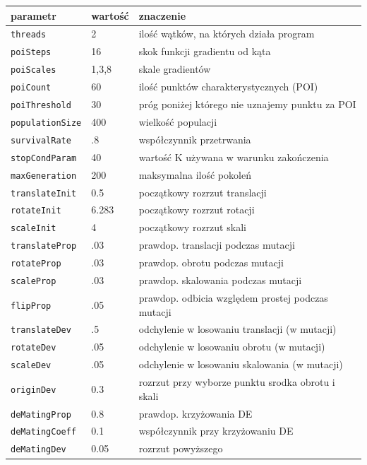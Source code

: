 \documentclass[a4paper,12pt,leqno]{article}
\begin{document}
\begin{tabular}{l|l|l}
parametr                & wartość & znaczenie \\
\hline
\texttt{threads}        & 2     & ilość wątków, na których działa program \\
\hline
\texttt{poiSteps}       & 16    & skok funkcji gradientu od kąta \\
\texttt{poiScales}      & 1,3,8 & skale gradientów \\
\texttt{poiCount}       & 60    & ilość punktów charakterystycznych (POI) \\
\texttt{poiThreshold}   & 30    & próg poniżej którego nie uznajemy punktu za POI \\
\hline
\texttt{populationSize} & 400   & wielkość populacji \\
\texttt{survivalRate}   & .8    & współczynnik przetrwania \\
\texttt{stopCondParam}  & 40    & wartość K używana w warunku zakończenia \\
\texttt{maxGeneration}  & 200   & maksymalna ilość pokoleń \\
\hline
\texttt{translateInit}  & 0.5   & początkowy rozrzut translacji\\
\texttt{rotateInit}     & 6.283 & początkowy rozrzut rotacji\\
\texttt{scaleInit}      & 4     & początkowy rozrzut skali \\
\hline
\texttt{translateProp}  & .03   & prawdop. translacji podczas mutacji \\
\texttt{rotateProp}     & .03   & prawdop. obrotu podczas mutacji \\
\texttt{scaleProp}      & .03   & prawdop. skalowania podczas mutacji \\
\texttt{flipProp}       & .05   & prawdop. odbicia względem prostej podczas mutacji \\
\hline
\texttt{translateDev}   & .5    & odchylenie w losowaniu translacji (w mutacji) \\
\texttt{rotateDev}      & .05   & odchylenie w losowaniu obrotu (w mutacji) \\
\texttt{scaleDev}       & .05   & odchylenie w losowaniu skalowania (w mutacji) \\
\texttt{originDev}      & 0.3   & rozrzut przy wyborze punktu srodka obrotu i skali \\
\hline
\texttt{deMatingProp}   & 0.8   & prawdop. krzyżowania DE \\
\texttt{deMatingCoeff}  & 0.1   & współczynnik przy krzyżowaniu DE \\
\texttt{deMatingDev}    & 0.05  & rozrzut powyższego \\
\end{tabular}
\end{document}
